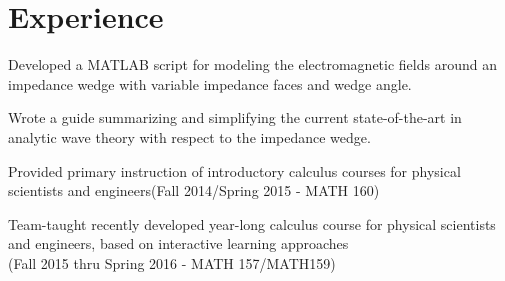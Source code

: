 \documentclass[letterpaper]{pine-resume} %
\begin{document}
\hfill
%
%
\begin{minipage}[t]{0.66\textwidth} %


\section{Experience}


\vspace{\topsep} %
\begin{tightitemize}
\item Developed a MATLAB script for modeling the electromagnetic fields around an impedance wedge with variable impedance faces and wedge angle.
\item Wrote a guide summarizing and simplifying the current state-of-the-art in analytic wave theory with respect to the impedance wedge.
\end{tightitemize}

\sectionspace %



\begin{tightitemize}
\item Provided primary instruction of introductory calculus courses for physical scientists and engineers(Fall 2014/Spring 2015 - MATH 160)
\item Team-taught recently developed year-long calculus course for physical scientists and engineers, based on interactive learning approaches \\
(Fall 2015 thru Spring 2016 - MATH 157/MATH159)
\end{tightitemize}

\sectionspace %


\end{minipage}
\end{document}
